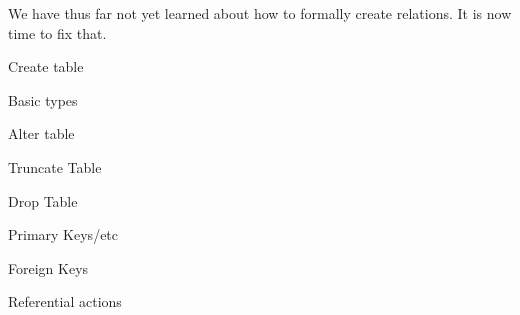 




We have thus far not yet learned about how to formally create relations. It is now time to fix that.

Create table

Basic types

Alter table

Truncate Table

Drop Table

Primary Keys/etc

Foreign Keys

Referential actions




